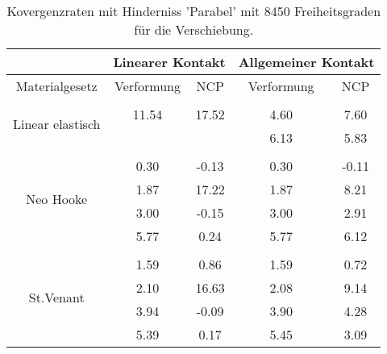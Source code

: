 \begin{table} 
\centering 
\begin{tabular}{c|cc|cc|} 
\cline{2-5} 
 & \multicolumn{2}{|c|}{Linearer Kontakt} & \multicolumn{2}{|c|}{Allgemeiner Kontakt} \\ 
\hline 
\multicolumn{1}{|c|}{Materialgesetz} & \multicolumn{1}{c|}{Verformung} & \multicolumn{1}{c|}{NCP} & \multicolumn{1}{c|}{Verformung} & \multicolumn{1}{c|}{NCP} \\ 
\hline 
\multicolumn{1}{|c|}{\multirow{3}{*}{Linear elastisch}} &\multicolumn{1}{|c|}{} & \multicolumn{1}{|c|}{} & \multicolumn{1}{|c|}{} & \multicolumn{1}{|c|}{} \\ 
\multicolumn{1}{|c|}{} & \multicolumn{1}{|c|}{     11.54} & \multicolumn{1}{|c|}{     17.52} & \multicolumn{1}{|c|}{      4.60} & \multicolumn{1}{|c|}{      7.60} \\ 
\multicolumn{1}{|c|}{} & \multicolumn{1}{|c|}{} & \multicolumn{1}{|c|}{} & \multicolumn{1}{|c|}{      6.13} & \multicolumn{1}{|c|}{      5.83} \\ 
\hline 
\multicolumn{1}{|c|}{\multirow{5}{*}{Neo Hooke}} &\multicolumn{1}{|c|}{} & \multicolumn{1}{|c|}{} & \multicolumn{1}{|c|}{} & \multicolumn{1}{|c|}{} \\ 
\multicolumn{1}{|c|}{} & \multicolumn{1}{|c|}{      0.30} & \multicolumn{1}{|c|}{     -0.13} & \multicolumn{1}{|c|}{      0.30} & \multicolumn{1}{|c|}{     -0.11} \\ 
\multicolumn{1}{|c|}{} & \multicolumn{1}{|c|}{      1.87} & \multicolumn{1}{|c|}{     17.22} & \multicolumn{1}{|c|}{      1.87} & \multicolumn{1}{|c|}{      8.21} \\ 
\multicolumn{1}{|c|}{} & \multicolumn{1}{|c|}{      3.00} & \multicolumn{1}{|c|}{     -0.15} & \multicolumn{1}{|c|}{      3.00} & \multicolumn{1}{|c|}{      2.91} \\ 
\multicolumn{1}{|c|}{} & \multicolumn{1}{|c|}{      5.77} & \multicolumn{1}{|c|}{      0.24} & \multicolumn{1}{|c|}{      5.77} & \multicolumn{1}{|c|}{      6.12} \\ 
\hline 
\multicolumn{1}{|c|}{\multirow{5}{*}{St.Venant}} &\multicolumn{1}{|c|}{} & \multicolumn{1}{|c|}{} & \multicolumn{1}{|c|}{} & \multicolumn{1}{|c|}{} \\ 
\multicolumn{1}{|c|}{} & \multicolumn{1}{|c|}{      1.59} & \multicolumn{1}{|c|}{      0.86} & \multicolumn{1}{|c|}{      1.59} & \multicolumn{1}{|c|}{      0.72} \\ 
\multicolumn{1}{|c|}{} & \multicolumn{1}{|c|}{      2.10} & \multicolumn{1}{|c|}{     16.63} & \multicolumn{1}{|c|}{      2.08} & \multicolumn{1}{|c|}{      9.14} \\ 
\multicolumn{1}{|c|}{} & \multicolumn{1}{|c|}{      3.94} & \multicolumn{1}{|c|}{     -0.09} & \multicolumn{1}{|c|}{      3.90} & \multicolumn{1}{|c|}{      4.28} \\ 
\multicolumn{1}{|c|}{} & \multicolumn{1}{|c|}{      5.39} & \multicolumn{1}{|c|}{      0.17} & \multicolumn{1}{|c|}{      5.45} & \multicolumn{1}{|c|}{      3.09} \\ 
\hline 
\end{tabular}\caption{Kovergenzraten mit Hinderniss 'Parabel' mit 8450 Freiheitsgraden für die Verschiebung.}\label{tab:Rate_Parabel_level5}
\end{table} 
